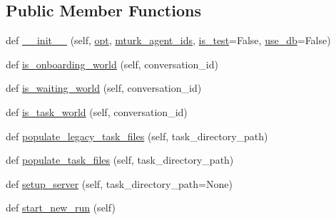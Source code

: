 \subsection*{Public Member Functions}
\begin{DoxyCompactItemize}
\item 
def \hyperlink{classparlai_1_1mturk_1_1core_1_1legacy__2018_1_1mturk__manager_1_1MTurkManager_a2d08f60b481cccbf13b6da5625fa0ea7}{\+\_\+\+\_\+init\+\_\+\+\_\+} (self, \hyperlink{classparlai_1_1mturk_1_1core_1_1legacy__2018_1_1mturk__manager_1_1MTurkManager_a4ae5366245bb4ddfeb732140e1a0df10}{opt}, \hyperlink{classparlai_1_1mturk_1_1core_1_1legacy__2018_1_1mturk__manager_1_1MTurkManager_affc00bd146a937a724d7e90e3f54150b}{mturk\+\_\+agent\+\_\+ids}, \hyperlink{classparlai_1_1mturk_1_1core_1_1legacy__2018_1_1mturk__manager_1_1MTurkManager_a1bbfe2403cd6c1c0d967e00d313e8786}{is\+\_\+test}=False, \hyperlink{classparlai_1_1mturk_1_1core_1_1legacy__2018_1_1mturk__manager_1_1MTurkManager_a4c3b573d399870e5a1c35fc992652ce7}{use\+\_\+db}=False)
\item 
def \hyperlink{classparlai_1_1mturk_1_1core_1_1legacy__2018_1_1mturk__manager_1_1MTurkManager_a8e5ffeec12e9e02e9d688d6c85a7ade2}{is\+\_\+onboarding\+\_\+world} (self, conversation\+\_\+id)
\item 
def \hyperlink{classparlai_1_1mturk_1_1core_1_1legacy__2018_1_1mturk__manager_1_1MTurkManager_aa45c495d74beae7786190dd622d80a22}{is\+\_\+waiting\+\_\+world} (self, conversation\+\_\+id)
\item 
def \hyperlink{classparlai_1_1mturk_1_1core_1_1legacy__2018_1_1mturk__manager_1_1MTurkManager_ab4214705590809115b5c564c5e00c9d0}{is\+\_\+task\+\_\+world} (self, conversation\+\_\+id)
\item 
def \hyperlink{classparlai_1_1mturk_1_1core_1_1legacy__2018_1_1mturk__manager_1_1MTurkManager_aad2d2657fc0c00b043d12b8391267308}{populate\+\_\+legacy\+\_\+task\+\_\+files} (self, task\+\_\+directory\+\_\+path)
\item 
def \hyperlink{classparlai_1_1mturk_1_1core_1_1legacy__2018_1_1mturk__manager_1_1MTurkManager_ac2daab087671cae12533a48b94c98ea6}{populate\+\_\+task\+\_\+files} (self, task\+\_\+directory\+\_\+path)
\item 
def \hyperlink{classparlai_1_1mturk_1_1core_1_1legacy__2018_1_1mturk__manager_1_1MTurkManager_a64a11ed7df28146d77cab7761105f6e7}{setup\+\_\+server} (self, task\+\_\+directory\+\_\+path=None)
\item 
def \hyperlink{classparlai_1_1mturk_1_1core_1_1legacy__2018_1_1mturk__manager_1_1MTurkManager_a505a28d4b39ae977a72a73ce726cbe14}{start\+\_\+new\+\_\+run} (self)

\end{DoxyCompactItemize}
